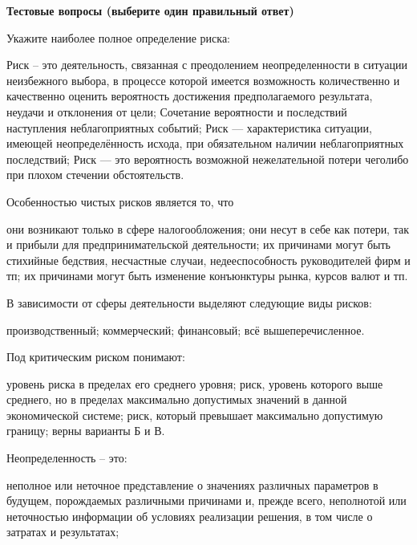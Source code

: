 \documentclass[12pt, table]{exam}
\begin{document}
\pagebreak
\noindent\textbf{Тестовые вопросы (выберите один правильный ответ)}

\begin{questions}
\begin{multicols}{2}
\setlength{\columnsep}{1cm}

\question Укажите наиболее полное определение риска:
	 \begin{choices}
	 \CC Риск – это деятельность, связанная с преодолением неопределенности в ситуации неизбежного выбора, в процессе которой имеется возможность количественно и качественно оценить вероятность достижения предполагаемого результата, неудачи и отклонения от цели;
	 \choice Сочетание вероятности и последствий наступления неблагоприятных событий;
	 \choice Риск — характеристика ситуации, имеющей неопределённость исхода, при обязательном наличии неблагоприятных последствий;
	 \choice Риск — это вероятность возможной нежелательной потери чеголибо при плохом стечении обстоятельств.
	 \end{choices}
\question Особенностью чистых рисков является то, что
	 \begin{choices}
	 \choice они возникают только в сфере налогообложения;
	 \choice они несут в себе как потери, так и прибыли для предпринимательской деятельности;
	 \CC их причинами могут быть стихийные бедствия, несчастные случаи, недееспособность руководителей фирм и тп;
	 \choice их причинами могут быть изменение конъюнктуры рынка, курсов валют и тп.
	 \end{choices}
\question В зависимости от сферы деятельности выделяют следующие виды рисков:
	 \begin{choices}
	 \choice производственный;
	 \choice коммерческий;
	 \choice финансовый;
	 \CC всё вышеперечисленное.
	 \end{choices}
\question Под критическим риском понимают:
	 \begin{choices}
	 \choice уровень риска в пределах его среднего уровня;
	 \CC риск, уровень которого выше среднего, но в пределах максимально допустимых значений в данной экономической системе;
	 \choice риск, который превышает максимально допустимую границу;
	 \choice верны варианты Б и В.
	 \end{choices}
\question Неопределенность – это:
	 \begin{choices}
	 \CC неполное или неточное представление о значениях различных параметров в будущем, порождаемых различными причинами и, прежде всего, неполнотой или неточностью информации об условиях реализации решения, в том числе о затратах и результатах;

\end{choices}
\end{multicols}
\end{questions}
\end{document}
